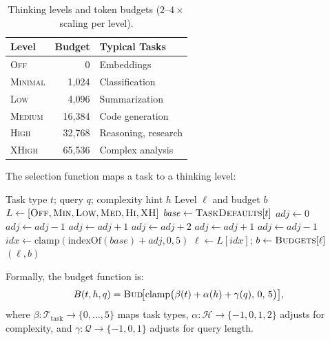 \documentclass{article}
\theoremstyle{plain}
\theoremstyle{definition}
\begin{document}
\begin{table}[t]
\caption{Thinking levels and token budgets ($2$--$4\times$ scaling per level).}
\label{tab:thinking}
\centering
\small
\begin{tabular}{@{}lrl@{}}
\toprule
\textbf{Level} & \textbf{Budget} & \textbf{Typical Tasks} \\
\midrule
\textsc{Off}     & 0       & Embeddings \\
\textsc{Minimal} & 1,024   & Classification \\
\textsc{Low}     & 4,096   & Summarization \\
\textsc{Medium}  & 16,384  & Code generation \\
\textsc{High}    & 32,768  & Reasoning, research \\
\textsc{XHigh}   & 65,536  & Complex analysis \\
\bottomrule
\end{tabular}
\end{table}

The selection function maps a task to a thinking level:

\begin{algorithm}[ht!]
\caption{Adaptive Thinking Level Selection}
\label{alg:thinking}
\begin{algorithmic}
\REQUIRE Task type $t$; query $q$; complexity hint $h$
\ENSURE Level $\ell$ and budget $b$
\STATE $L \leftarrow [\textsc{Off}, \textsc{Min}, \textsc{Low}, \textsc{Med}, \textsc{Hi}, \textsc{XH}]$
\STATE $\mathit{base} \leftarrow \textsc{TaskDefaults}[t]$
\STATE $\mathit{adj} \leftarrow 0$
 \STATE $\mathit{adj} \leftarrow \mathit{adj} - 1$ \ENDIF
{} \STATE $\mathit{adj} \leftarrow \mathit{adj} + 1$ \ENDIF
{} \STATE $\mathit{adj} \leftarrow \mathit{adj} + 2$ \ENDIF
{} \STATE $\mathit{adj} \leftarrow \mathit{adj} + 1$ \ENDIF
{} \STATE $\mathit{adj} \leftarrow \mathit{adj} - 1$ \ENDIF
\STATE $\mathit{idx} \leftarrow \mathrm{clamp}(\mathrm{indexOf}(\mathit{base}) + \mathit{adj}, 0, 5)$
\STATE $\ell \leftarrow L[\mathit{idx}]$; \; $b \leftarrow \textsc{Budgets}[\ell]$
\RETURN $(\ell, b)$
\end{algorithmic}
\end{algorithm}

Formally, the budget function is:
\begin{equation}\label{eq:budget}
  B(t, h, q) = \textsc{Bud}\!\bigl[\mathrm{clamp}\bigl(\beta(t) + \alpha(h) + \gamma(q),\, 0,\, 5\bigr)\bigr],
\end{equation}
where $\beta\!: \mathcal{T}_\mathrm{task} \to \{0,\ldots,5\}$ maps task types,
$\alpha\!: \mathcal{H} \to \{-1, 0, 1, 2\}$ adjusts for complexity, and
$\gamma\!: \mathcal{Q} \to \{-1, 0, 1\}$ adjusts for query length.
\end{document}
